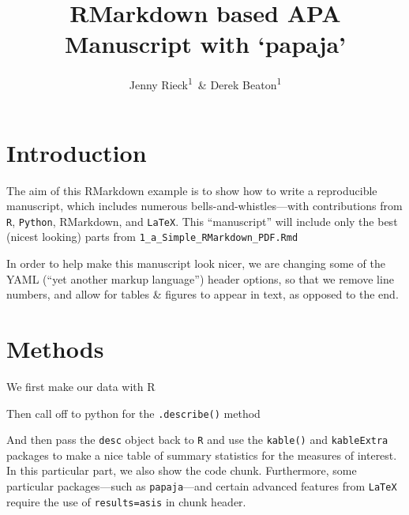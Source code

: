\documentclass[man,floatsintext]{apa6}
\title{RMarkdown based APA Manuscript with `papaja'}
\author{Jenny Rieck\textsuperscript{1}~\& Derek Beaton\textsuperscript{1}}
\date{}
\affiliation{
\vspace{0.5cm}
\textsuperscript{1} Rotman Research Institute}
\newenvironment{Shaded}{\begin{snugshade}}{\end{snugshade}}
\newcommand{\DataTypeTok}[1]{\textcolor[rgb]{0.13,0.29,0.53}{#1}}
\newcommand{\KeywordTok}[1]{\textcolor[rgb]{0.13,0.29,0.53}{\textbf{#1}}}
\newcommand{\NormalTok}[1]{#1}
\newcommand{\OperatorTok}[1]{\textcolor[rgb]{0.81,0.36,0.00}{\textbf{#1}}}
\newcommand{\StringTok}[1]{\textcolor[rgb]{0.31,0.60,0.02}{#1}}
\theoremstyle{definition}
\theoremstyle{definition}
\theoremstyle{definition}
\theoremstyle{remark}
\begin{document}
\maketitle

\hypertarget{introduction}{%
\section{Introduction}\label{introduction}}

The aim of this RMarkdown example is to show how to write a reproducible
manuscript, which includes numerous bells-and-whistles---with
contributions from \texttt{R}, \texttt{Python}, RMarkdown, and
\texttt{LaTeX}. This \enquote{manuscript} will include only the best
(nicest looking) parts from \texttt{1\_a\_Simple\_RMarkdown\_PDF.Rmd}

In order to help make this manuscript look nicer, we are changing some
of the YAML (\enquote{yet another markup language}) header options, so
that we remove line numbers, and allow for tables \& figures to appear
in text, as opposed to the end.

\hypertarget{methods}{%
\section{Methods}\label{methods}}

We first make our data with R

Then call off to python for the \texttt{.describe()} method

And then pass the \texttt{desc} object back to \texttt{R} and use the
\texttt{kable()} and \texttt{kableExtra} packages to make a nice table
of summary statistics for the measures of interest. In this particular
part, we also show the code chunk. Furthermore, some particular
packages---such as \texttt{papaja}---and certain advanced features from
\texttt{LaTeX} require the use of
\texttt{results=\textquotesingle{}asis\textquotesingle{}} in chunk
header.

\begin{Shaded}
\end{Shaded}
\end{document}
